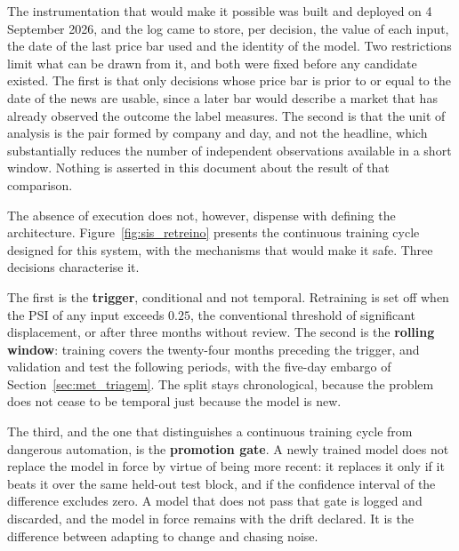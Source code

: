 The instrumentation that would make it possible was built and deployed on 4 September 2026, and
the log came to store, per decision, the value of each input, the date of the last price bar used
and the identity of the model. Two restrictions limit what can be drawn from it, and both were
fixed before any candidate existed. The first is that only decisions whose price bar is prior to or
equal to the date of the news are usable, since a later bar would describe a market that has
already observed the outcome the label measures. The second is that the unit of analysis is the
pair formed by company and day, and not the headline, which substantially reduces the number of
independent observations available in a short window. Nothing is asserted in this document about
the result of that comparison.

The absence of execution does not, however, dispense with defining the architecture.
Figure~\ref{fig:sis_retreino} presents the continuous training cycle designed for this system, with
the mechanisms that would make it safe. Three decisions characterise it.

The first is the \textbf{trigger}, conditional and not temporal. Retraining is set off when the
\gls{PSI} of any input exceeds $0.25$, the conventional threshold of significant
displacement, or after three months without review. The second is the \textbf{rolling window}:
training covers the twenty-four months preceding the trigger, and validation and test the following
periods, with the five-day embargo of Section~\ref{sec:met_triagem}. The split stays chronological,
because the problem does not cease to be temporal just because the model is new.

The third, and the one that distinguishes a continuous training cycle from dangerous automation,
is the \textbf{promotion gate}. A newly trained model does not replace the model in force by virtue
of being more recent: it replaces it only if it beats it over the same held-out test block, and if
the confidence interval of the difference excludes zero. A model that does not pass that gate is
logged and discarded, and the model in force remains with the drift declared. It is the difference
between adapting to change and chasing noise.

